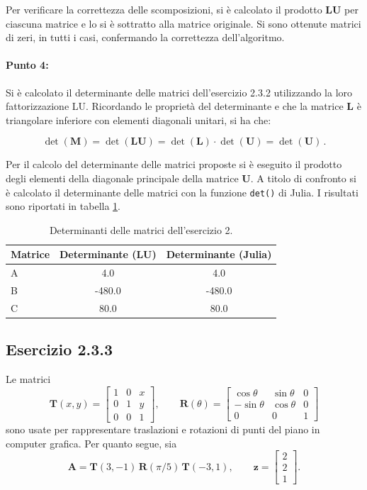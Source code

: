 \documentclass[letterpaper, 12pt]{article}
\numberwithin{equation}{section}    %
\begin{document}
Per verificare la correttezza delle scomposizioni, si è calcolato il prodotto $\mathbf{L}\mathbf{U}$ per ciascuna 
matrice e lo si è sottratto alla matrice originale. Si sono ottenute matrici di zeri, in tutti i casi, 
confermando la correttezza dell'algoritmo.

\paragraph{Punto 4:} Si è calcolato il determinante delle matrici dell'esercizio 2.3.2 utilizzando la loro
fattorizzazione LU. Ricordando le proprietà del determinante e che la matrice $\mathbf{L}$ è triangolare inferiore 
con elementi diagonali unitari, si ha che:

\begin{equation*}
    \det(\mathbf{M}) = \det(\mathbf{LU}) = \det(\mathbf{L}) \cdot \det(\mathbf{U}) = \det(\mathbf{U})\,.
\end{equation*}

Per il calcolo del determinante delle matrici proposte si è eseguito il prodotto degli elementi della diagonale
principale della matrice $\mathbf{U}$. A titolo di confronto si è calcolato il determinante delle matrici con 
la funzione \texttt{det()} di Julia. I risultati sono riportati in tabella \ref{tab:determinanti}.
\begin{table}[!ht]
\centering
\caption{Determinanti delle matrici dell'esercizio 2.}
\label{tab:determinanti}
\begin{tabular}{|l|c|c|}
\hline
\textbf{Matrice} & \textbf{Determinante (LU)} & \textbf{Determinante (Julia)} \\
\hline
A                & 4.0                        & 4.0 \\
B                & -480.0                     & -480.0 \\
C                & 80.0                       & 80.0  \\
\hline
\end{tabular}
\end{table}

\subsection{Esercizio 2.3.3}
Le matrici
\[
\mathbf{T}(x,y) = \begin{bmatrix}
    1 & 0 & x \\ 
    0 & 1 & y \\ 
    0 & 0 & 1
\end{bmatrix},\qquad
\mathbf{R}(\theta) = \begin{bmatrix}
    \cos\theta & \sin \theta & 0 \\ 
    -\sin\theta & \cos \theta & 0 \\
    0 & 0 & 1
\end{bmatrix}
\]
sono usate per rappresentare traslazioni e rotazioni di punti del piano in computer grafica. Per quanto segue, sia
\[
\mathbf{A} = \mathbf{T}(3,-1)\,\mathbf{R}(\pi/5)\,\mathbf{T}(-3,1), \qquad 
\mathbf{z} = \begin{bmatrix}
    2 \\ 2 \\ 1
\end{bmatrix}.
\]
\end{document}
